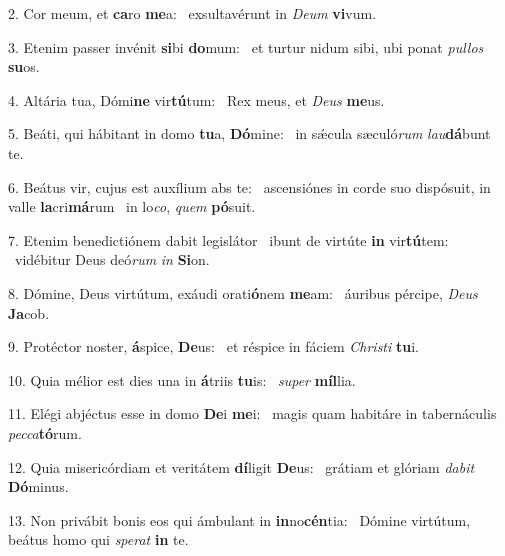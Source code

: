 2. Cor meum, et \textbf{ca}ro \textbf{me}a: \ast\  exsultavérunt in \textit{De}\textit{um} \textbf{vi}vum.\

3. Etenim passer invénit \textbf{si}bi \textbf{do}mum: \ast\  et turtur nidum sibi, ubi ponat \textit{pul}\textit{los} \textbf{su}os.\

4. Altária tua, Dómi\textbf{ne} vir\textbf{tú}tum: \ast\  Rex meus, et \textit{De}\textit{us} \textbf{me}us.\

5. Beáti, qui hábitant in domo \textbf{tu}a, \textbf{Dó}mine: \ast\  in sǽcula sæculó\textit{rum} \textit{lau}\textbf{dá}bunt te.\

6. Beátus vir, cujus est auxílium abs te: \dag\  ascensiónes in corde suo dispósuit, in valle \textbf{la}cri\textbf{má}rum \ast\  in lo\textit{co}, \textit{quem} \textbf{pó}suit.\

7. Etenim benedictiónem dabit legislátor \dag\  ibunt de virtúte \textbf{in} vir\textbf{tú}tem: \ast\  vidébitur Deus deó\textit{rum} \textit{in} \textbf{Si}on.\

8. Dómine, Deus virtútum, exáudi orati\textbf{ó}nem \textbf{me}am: \ast\  áuribus pércipe, \textit{De}\textit{us} \textbf{Ja}cob.\

9. Protéctor noster, \textbf{á}spice, \textbf{De}us: \ast\  et réspice in fáciem \textit{Chris}\textit{ti} \textbf{tu}i.\

10. Quia mélior est dies una in \textbf{á}triis \textbf{tu}is: \ast\  \textit{su}\textit{per} \textbf{míl}lia.\

11. Elégi abjéctus esse in domo \textbf{De}i \textbf{me}i: \ast\  magis quam habitáre in tabernáculis \textit{pec}\textit{ca}\textbf{tó}rum.\

12. Quia misericórdiam et veritátem \textbf{dí}ligit \textbf{De}us: \ast\  grátiam et glóriam \textit{da}\textit{bit} \textbf{Dó}minus.\

13. Non privábit bonis eos qui ámbulant in \textbf{in}no\textbf{cén}tia: \ast\  Dómine virtútum, beátus homo qui \textit{spe}\textit{rat} \textbf{in} te.\

